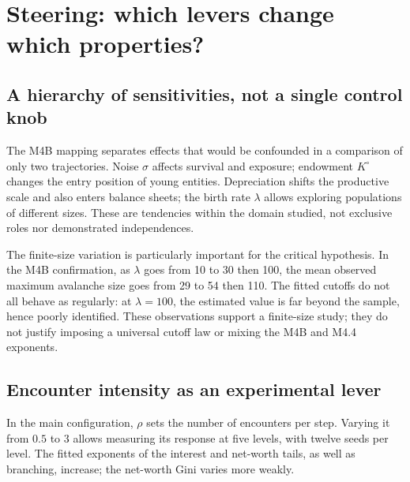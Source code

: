 \section{Steering: which levers change which properties?}\label{sec:pilotage}
\subsection{A hierarchy of sensitivities, not a single control knob}
The M4B mapping separates effects that would be confounded in a
comparison of only two trajectories. Noise $\sigma$ affects survival and
exposure; endowment $K^\circ$ changes the entry position of young
entities. Depreciation shifts the productive scale and also enters
balance sheets; the birth rate $\lambda$ allows exploring populations of
different sizes. These are tendencies within the domain studied, not
exclusive roles nor demonstrated independences.


The finite-size variation is particularly important for the critical
hypothesis. In the M4B confirmation, as $\lambda$ goes from 10 to 30
then 100, the mean observed maximum avalanche size goes from 29 to 54
then 110. The fitted cutoffs do not all behave as regularly: at
$\lambda=100$, the estimated value is far beyond the sample, hence
poorly identified. These observations support a finite-size study; they
do not justify imposing a universal cutoff law or mixing the M4B and
M4.4 exponents.

\subsection{Encounter intensity as an experimental lever}
In the main configuration, $\rho$ sets the number of encounters per
step. Varying it from $0.5$ to $3$ allows measuring its response at
five levels, with twelve seeds per level. The fitted exponents of the
interest and net-worth tails, as well as branching, increase; the
net-worth Gini varies more weakly.

